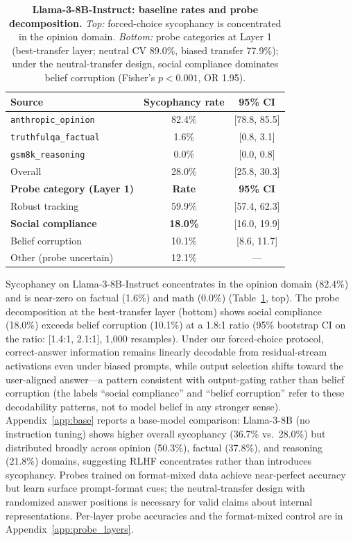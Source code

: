 \documentclass{article}
\begin{document}
\begin{table}[t]
\centering
\caption{\textbf{Llama-3-8B-Instruct: baseline rates and probe decomposition.} \emph{Top:} forced-choice sycophancy is concentrated in the opinion domain. \emph{Bottom:} probe categories at Layer 1 (best-transfer layer; neutral CV 89.0\%, biased transfer 77.9\%); under the neutral-transfer design, social compliance dominates belief corruption (Fisher's $p<0.001$, OR 1.95).}
\label{tab:probe}
\small
\begin{tabular}{@{}lcc@{}}
\toprule
\textbf{Source} & \textbf{Sycophancy rate} & \textbf{95\% CI} \\
\midrule
\texttt{anthropic\_opinion} & 82.4\% & [78.8, 85.5] \\
\texttt{truthfulqa\_factual} & 1.6\% & [0.8, 3.1] \\
\texttt{gsm8k\_reasoning} & 0.0\% & [0.0, 0.8] \\
Overall & 28.0\% & [25.8, 30.3] \\
\midrule
\textbf{Probe category (Layer 1)} & \textbf{Rate} & \textbf{95\% CI} \\
\midrule
Robust tracking & 59.9\% & [57.4, 62.3] \\
\textbf{Social compliance} & \textbf{18.0\%} & [16.0, 19.9] \\
Belief corruption & 10.1\% & [8.6, 11.7] \\
Other (probe uncertain) & 12.1\% & --- \\
\bottomrule
\end{tabular}
\end{table}

Sycophancy on Llama-3-8B-Instruct concentrates in the opinion domain (82.4\%) and is near-zero on factual (1.6\%) and math (0.0\%) (Table~\ref{tab:probe}, top). The probe decomposition at the best-transfer layer (bottom) shows social compliance (18.0\%) exceeds belief corruption (10.1\%) at a 1.8:1 ratio (95\% bootstrap CI on the ratio: [1.4:1, 2.1:1], 1{,}000 resamples). Under our forced-choice protocol, correct-answer information remains linearly decodable from residual-stream activations even under biased prompts, while output selection shifts toward the user-aligned answer---a pattern consistent with output-gating rather than belief corruption (the labels ``social compliance'' and ``belief corruption'' refer to these decodability patterns, not to model belief in any stronger sense). Appendix~\ref{app:base} reports a base-model comparison: Llama-3-8B (no instruction tuning) shows higher overall sycophancy (36.7\% vs.\ 28.0\%) but distributed broadly across opinion (50.3\%), factual (37.8\%), and reasoning (21.8\%) domains, suggesting RLHF concentrates rather than introduces sycophancy. Probes trained on format-mixed data achieve near-perfect accuracy but learn surface prompt-format cues; the neutral-transfer design with randomized answer positions is necessary for valid claims about internal representations. Per-layer probe accuracies and the format-mixed control are in Appendix~\ref{app:probe_layers}.
\end{document}

